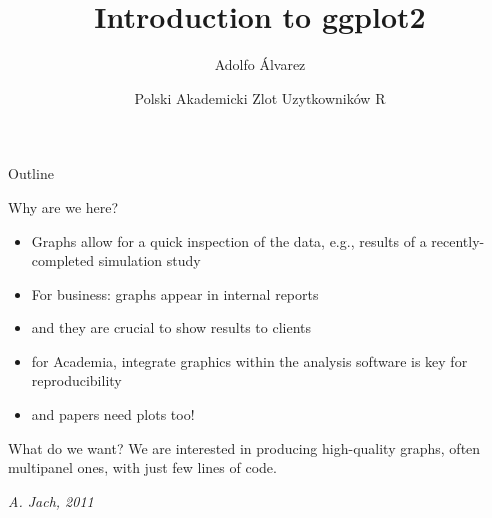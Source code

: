 \documentclass{beamer}\usepackage[]{graphicx}\usepackage[]{color}
\institute[Analyx]
\date[October 2014] %
{Polski Akademicki Zlot Uzytkownik\'{o}w R}
\begin{document}
{
\begin{frame}[plain]
\end{frame}
}


\title{Introduction to ggplot2}
\author{Adolfo \'{A}lvarez}
 
\maketitle
 
 
 \begin{frame}{Outline}
  \tableofcontents
\end{frame}

\begin{frame}{Why are we here?}
\begin{itemize}
\item Graphs allow for a quick inspection of the data, e.g., results
of a recently-completed simulation study
\item For business: graphs appear in internal reports
\item and they are crucial to show results to clients
\item for Academia, integrate graphics within the analysis software is key for reproducibility
\item and papers need plots too! 
\end{itemize}
\begin{block}{What do we want?}
We are interested in producing high-quality graphs, often
multipanel ones, with just few lines of code.
\begin{flushright}
\textit{A. Jach, 2011}
\end{flushright}
\end{block}
\end{frame}
\end{document}
